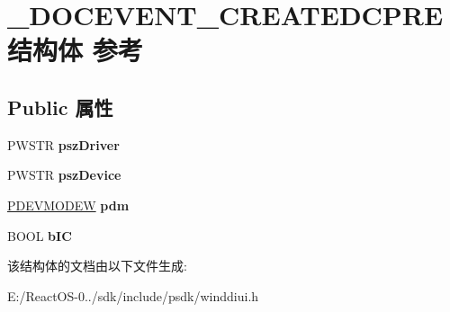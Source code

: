 \hypertarget{struct___d_o_c_e_v_e_n_t___c_r_e_a_t_e_d_c_p_r_e}{}\section{\+\_\+\+D\+O\+C\+E\+V\+E\+N\+T\+\_\+\+C\+R\+E\+A\+T\+E\+D\+C\+P\+R\+E结构体 参考}
\label{struct___d_o_c_e_v_e_n_t___c_r_e_a_t_e_d_c_p_r_e}
\subsection*{Public 属性}
\begin{DoxyCompactItemize}
\item 
\mbox{\label{struct___d_o_c_e_v_e_n_t___c_r_e_a_t_e_d_c_p_r_e_a98022f9008a2f719c5cfa7c12573c586}} 
P\+W\+S\+TR {\bfseries psz\+Driver}
\item 
\mbox{\label{struct___d_o_c_e_v_e_n_t___c_r_e_a_t_e_d_c_p_r_e_ad9909d95175787cde818c3fbe7d65c0a}} 
P\+W\+S\+TR {\bfseries psz\+Device}
\item 
\mbox{\label{struct___d_o_c_e_v_e_n_t___c_r_e_a_t_e_d_c_p_r_e_ae1e6bba3eb956777912fa810034322e3}} 
\hyperlink{struct__devicemode_w}{P\+D\+E\+V\+M\+O\+D\+EW} {\bfseries pdm}
\item 
\mbox{\label{struct___d_o_c_e_v_e_n_t___c_r_e_a_t_e_d_c_p_r_e_a102a0d0588eee816d3ce0034c7b0251a}} 
B\+O\+OL {\bfseries b\+IC}
\end{DoxyCompactItemize}


该结构体的文档由以下文件生成\+:\begin{DoxyCompactItemize}
\item 
E\+:/\+React\+O\+S-\/0../sdk/include/psdk/winddiui.\+h\end{DoxyCompactItemize}

